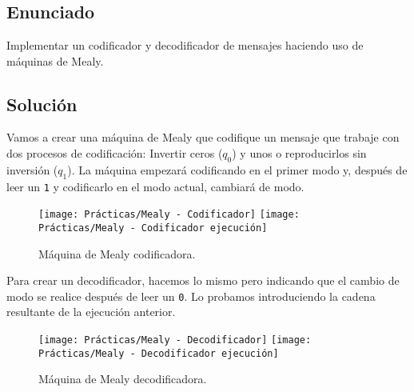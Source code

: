 \chapter{}

\section{Enunciado}

Implementar un codificador y decodificador de mensajes haciendo uso de máquinas de Mealy.

\section{Solución}

Vamos a crear una máquina de Mealy que codifique un mensaje que trabaje con dos procesos de codificación:
Invertir ceros ($q_0$) y unos o reproducirlos sin inversión ($q_1$).
La máquina empezará codificando en el primer modo y, después de leer un \texttt{1} y codificarlo en el modo actual, cambiará de modo.

\begin{figure}[h!]
\begin{center}
	\texttt{[image: Prácticas/Mealy - Codificador]}
	\texttt{[image: Prácticas/Mealy - Codificador ejecución]}
\end{center}
\caption{Máquina de Mealy codificadora.}
\end{figure}

Para crear un decodificador, hacemos lo mismo pero indicando que el cambio de modo se realice después de leer un \texttt{0}.
Lo probamos introduciendo la cadena resultante de la ejecución anterior.

\begin{figure}[h!]
\begin{center}
	\texttt{[image: Prácticas/Mealy - Decodificador]}
	\texttt{[image: Prácticas/Mealy - Decodificador ejecución]}
\end{center}
\caption{Máquina de Mealy decodificadora.}
\end{figure}
